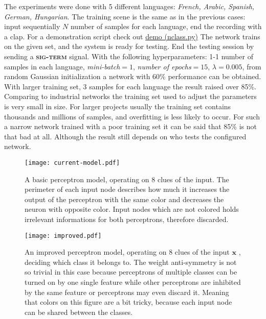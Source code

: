 The experiments were done with 5 different languages: \emph{French, Arabic, Spanish, German, Hungarian}. The training scene is the same as in the previous cases: input sequentially $N$ number of samples for each language, end the recording with a clap.
For a demonstration script check out \href{https://github.com/botcs/deepvision/tree/master/demo/audio}{demo (nclass.py)}
The network trains on the given set, and the system is ready for testing. End the testing session by sending a \textbf{\textsc{sig-term}} signal. With the following hyperparameters: 1-1 number of samples in each language, \emph{mini-batch}$=1$, \emph{number of epochs}$=15$, $\lambda=0.005$, from random Gaussian initialization a network with 60\% performance can be obtained. With larger training set, 3 samples for each language the result raised over 85\%. Comparing to industrial networks the training set used to adjust the parameters is very small in size. For larger projects usually the training set contains thousands and millions of samples, and overfitting is less likely to occur. For such a narrow network trained with a poor training set it can be said that 85\% is not that bad at all. Although the result still depends on who tests the configured network.

\begin{figure}
	\centering
	\texttt{[image: current-model.pdf]}
	\caption{A basic perceptron model, operating on 8 clues of the input. The perimeter of each input node describes how much it increases the output of the perceptron with the same color and decreases the neuron with opposite color. Input nodes which are not colored holds irrelevant informations for both perceptrons, therefore discarded.}
	
	\label{fig:dumb}
\end{figure}

\begin{figure}
	\centering
	\texttt{[image: improved.pdf]}
	\caption{An improved perceptron model, operating on 8 clues of the input $\mathbf{x}$ , deciding which class it belongs to. The weight anti-symmetry is not so trivial in this case because perceptrons of multiple classes can be turned on by one single feature while other perceptrons are inhibited by the same feature or perceptrons may even discard it. Meaning that colors on this figure are a bit tricky, because each input node can be shared between the classes.}
	
	\label{fig:improved}
\end{figure}

